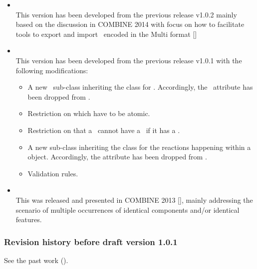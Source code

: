 \begin{itemize}
 \item {} \\
 \label{def:v1_0_3}
 This version has been developed from the previous release v1.0.2 mainly based on the discussion in COMBINE 2014 with focus on how to facilitate tools to export and import \smodels\ encoded in the Multi format [\cite{ref:combine2014}] 

 \item {} \\
 \label{def:v1_0_2}
 This version has been developed from the previous release v1.0.1 with the following modifications: 

 \begin{itemize}
  \item A new \BindingSiteSpeciesType\ sub-class inheriting the \SpeciesType class for . Accordingly, the \isBindingSiteAtt\ attribute has been dropped from \SpeciesType.
  \item Restriction on  which have to be atomic.
  \item Restriction on \SpeciesType that a \speciesType\ cannot have a \listOfSpeciesFeatureTypes\ if it has a \listOfInSpeciesTypeBonds. 
  \item A new \IntraSpeciesReaction sub-class inheriting the \Reaction class for the reactions happening within a \ExSpecies object. Accordingly, the  attribute has been dropped from \Reaction.
  \item Validation rules. 
 \end{itemize}

 \item {} \\
 \label{def:v1_0_1}
 This was released and presented in COMBINE 2013 [\cite{ref:combine2013}], mainly addressing the scenario of multiple occurrences of identical components and/or identical features.

\end{itemize}


\subsubsection{Revision history before draft version 1.0.1}
\label{def:v1_before}

See the past work ().


\clearpage

